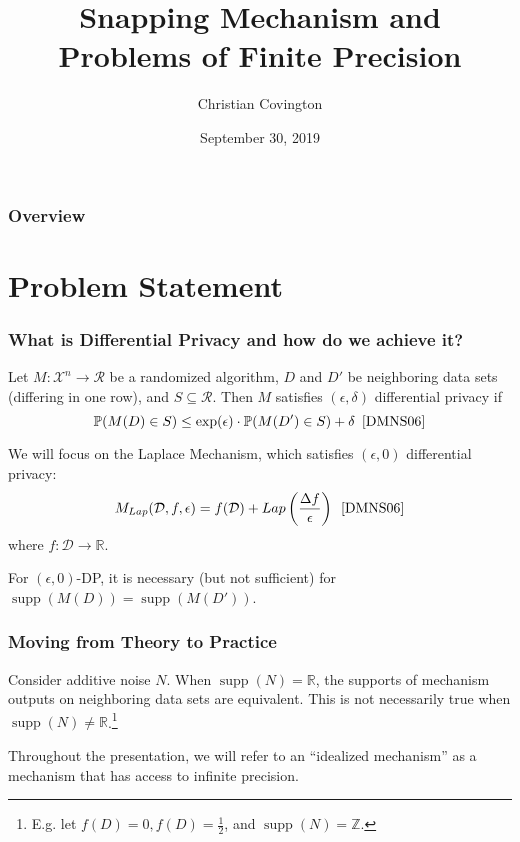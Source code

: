 \documentclass{beamer}
\title{Snapping Mechanism and Problems of Finite Precision}
\author{Christian Covington}
\institute{Harvard University Privacy Tools Project}
\date{September 30, 2019}
\DeclareMathOperator\supp{supp}
\begin{document}
\frame{\titlepage}

\begin{frame}
    \frametitle{Overview}
    \tableofcontents
\end{frame}

\section{Problem Statement}

\begin{frame}[shrink=10]
    \frametitle{What is Differential Privacy and how do we achieve it?}
    Let $M : \mathcal{X}^{n} \rightarrow \mathcal{R}$ be a randomized algorithm, $D$ and $D'$ be neighboring data sets (differing in one row), and $S \subseteq \mathcal{R}$. Then $M$ satisfies $(\epsilon, \delta)$ differential privacy if
    \[ \mathbb{P}(M(D) \in S) \leq \exp(\epsilon) \cdot \mathbb{P}(M(D') \in S) + \delta \hspace{5pt} \cite{DMNS06} \]

    \pause

    We will focus on the Laplace Mechanism, which satisfies $(\epsilon, 0)$ differential privacy:
    \[ M_{Lap}(\mathcal{D}, f, \epsilon) = f(\mathcal{D}) + Lap \left(\frac{\Delta f}{\epsilon} \right) \hspace{5pt} \cite{DMNS06} \]
    where $f: \mathcal{D} \rightarrow \mathbb{R}$.

    \pause

    For $(\epsilon, 0)$-DP, it is necessary (but not sufficient) for $\supp\left( M(D) \right) = \supp\left( M(D') \right)$.
\end{frame}

\begin{frame}
    \frametitle{Moving from Theory to Practice}
    Consider additive noise $N$. When $\supp(N) = \mathbb{R}$, the supports of mechanism outputs on neighboring data sets are equivalent.
    This is not necessarily true when $\supp(N) \neq \mathbb{R}$.\footnote{E.g. let $f(D) = 0, f(D) = \frac{1}{2}$, and $\supp(N) = \mathbb{Z}$.}


    Throughout the presentation, we will refer to an ``idealized mechanism'' as a mechanism that has access to infinite precision.
\end{frame}
\end{document}
